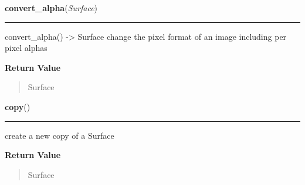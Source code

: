     \label{pygame:Surface:convert_alpha}

    \vspace{0.5ex}

\hspace{.8\funcindent}\begin{boxedminipage}{\funcwidth}

    \raggedright \textbf{convert\_alpha}(\textit{Surface})

    \vspace{-1.5ex}

    \rule{\textwidth}{0.5\fboxrule}
\setlength{\parskip}{2ex}
    convert\_alpha() -{\textgreater} Surface change the pixel format of an 
    image including per pixel alphas

\setlength{\parskip}{1ex}
      \textbf{Return Value}
    \vspace{-1ex}

      \begin{quote}
      Surface

      \end{quote}

    \end{boxedminipage}

    \label{pygame:Surface:copy}

    \vspace{0.5ex}

\hspace{.8\funcindent}\begin{boxedminipage}{\funcwidth}

    \raggedright \textbf{copy}()

    \vspace{-1.5ex}

    \rule{\textwidth}{0.5\fboxrule}
\setlength{\parskip}{2ex}
    create a new copy of a Surface

\setlength{\parskip}{1ex}
      \textbf{Return Value}
    \vspace{-1ex}

      \begin{quote}
      Surface

      \end{quote}

    \end{boxedminipage}

    \label{pygame:Surface:fill}

